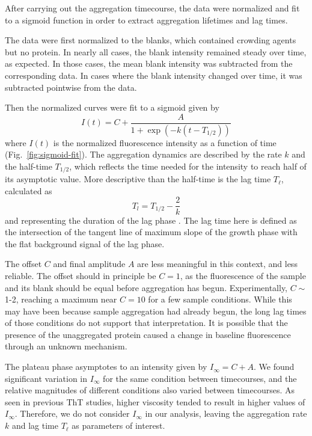 After carrying out the aggregation timecourse, the data were normalized and fit to a sigmoid function in order to extract aggregation lifetimes and lag times.

The data were first normalized to the blanks, which contained crowding agents but no protein.  In nearly all cases, the blank intensity remained steady over time, as expected.  In those cases, the mean blank intensity was subtracted from the corresponding data.  In cases where the blank intensity changed over time, it was subtracted pointwise from the data.

Then the normalized curves were fit to a sigmoid given by
\begin{equation}
I(t) = C + \frac{A}{1+\exp \left(-k(t-T_{1/2})\right)}
\label{eq:sig-fit}
\end{equation}
where $I(t)$ is the normalized fluorescence intensity as a function of time (Fig.~\ref{fig:sigmoid-fit}).  The aggregation dynamics are described by the rate $k$ and the half-time $T_{1/2}$, which reflects the time needed for the intensity to reach half of its asymptotic value.  More descriptive than the half-time is the lag time $T_\ell$, calculated as
\begin{equation}
T_l = T_{1/2} - \frac{2}{k}
\end{equation}
and representing the duration of the lag phase \cite{arosio15}.  The lag time here is defined as the intersection of the tangent line of maximum slope of the growth phase with the flat background signal of the lag phase.  

The offset $C$ and final amplitude $A$ are less meaningful in this context, and less reliable.  The offset should in principle be $C=1$, as the fluorescence of the sample and its blank should be equal before aggregation has begun.   Experimentally, $C \sim$ 1-2, reaching a maximum near $C= 10$ for a few sample conditions.  While this may have been because sample aggregation had already begun, the long lag times of those conditions do not support that interpretation.  It is possible that the presence of the unaggregated protein caused a change in baseline fluorescence through an unknown mechanism.

The plateau phase asymptotes to an intensity given by $I_\infty=C+A$.  We found significant variation in $I_\infty$ for the same condition between timecourses, and the relative magnitudes of different conditions also varied between timecourses.  As seen in previous ThT studies, higher viscosity tended to result in higher values of $I_\infty$. Therefore, we do not consider $I_\infty$ in our analysis, leaving the aggregation rate $k$ and lag time $T_\ell$ as parameters of interest.

